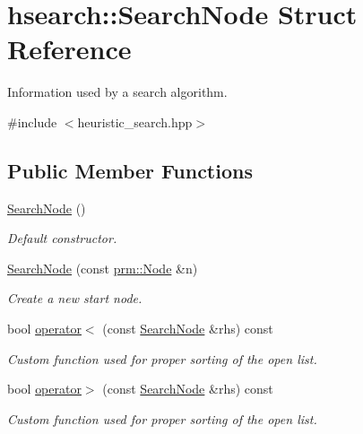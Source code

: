 \hypertarget{structhsearch_1_1SearchNode}{}\section{hsearch\+:\+:Search\+Node Struct Reference}
\label{structhsearch_1_1SearchNode}


Information used by a search algorithm.  




{\ttfamily \#include $<$heuristic\+\_\+search.\+hpp$>$}

\subsection*{Public Member Functions}
\begin{DoxyCompactItemize}
\item 
\mbox{\label{structhsearch_1_1SearchNode_a1e461dc25eef2e8de76dd7bd70042e22}} 
\hyperlink{structhsearch_1_1SearchNode_a1e461dc25eef2e8de76dd7bd70042e22}{Search\+Node} ()
\begin{DoxyCompactList}\small\item\em Default constructor. \end{DoxyCompactList}\item 
\hyperlink{structhsearch_1_1SearchNode_abc34e7eab1d4b3d269f9b360b77936a5}{Search\+Node} (const \hyperlink{structprm_1_1Node}{prm\+::\+Node} \&n)
\begin{DoxyCompactList}\small\item\em Create a new start node. \end{DoxyCompactList}\item 
bool \hyperlink{structhsearch_1_1SearchNode_a936d6ea25917367b88adde4748c9143c}{operator$<$} (const \hyperlink{structhsearch_1_1SearchNode}{Search\+Node} \&rhs) const
\begin{DoxyCompactList}\small\item\em Custom function used for proper sorting of the open list. \end{DoxyCompactList}\item 
bool \hyperlink{structhsearch_1_1SearchNode_a492955fe1a5cdfae1dc0474232cb7175}{operator$>$} (const \hyperlink{structhsearch_1_1SearchNode}{Search\+Node} \&rhs) const
\begin{DoxyCompactList}\small\item\em Custom function used for proper sorting of the open list. \end{DoxyCompactList}\end{DoxyCompactItemize}
